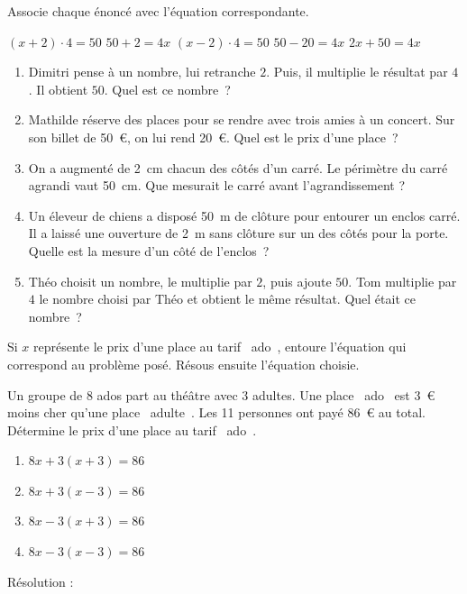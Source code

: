 \documentclass[../math2.tex]{subfiles}
\begin{document}
\begin{exercise}
  Associe chaque énoncé avec l'équation correspondante.

  $(x+2)\cdot 4 = 50$\hfil
  $50+2=4x$\hfil
  $(x-2)\cdot 4 = 50$\hfil
  $50-20=4x$\hfil
  $2x+50 = 4x$

  \begin{enumerate}
    \item Dimitri pense à un nombre, lui retranche $2$. Puis, il multiplie le résultat par $4$. Il obtient $50$. Quel est ce nombre~? 
    \item Mathilde réserve des places pour se rendre avec trois amies à un concert. Sur son billet de 50~€, on lui rend 20~€. Quel est le prix d'une place~? 
    \item On a augmenté de \SI{2}{cm} chacun des côtés d'un carré. Le périmètre du carré agrandi vaut \SI{50}{cm}. Que mesurait le carré avant l'agrandissement ? 
    \item Un éleveur de chiens a disposé \SI{50}{m} de clôture pour entourer un enclos carré. Il a laissé une ouverture de \SI{2}{m} sans clôture sur un des côtés pour la porte. Quelle est la mesure d'un côté de l'enclos~? 
    \item Théo choisit un nombre, le multiplie par $2$, puis ajoute $50$. Tom multiplie par $4$ le nombre choisi par Théo et obtient le même résultat. Quel était ce nombre~? 
  \end{enumerate}
\end{exercise}

\begin{exercise}
  Si $x$ représente le prix d'une place au tarif \og~ado~\fg{}, entoure l'équation qui correspond au problème posé. Résous ensuite l'équation choisie.

  Un groupe de 8 ados part au théâtre avec 3 adultes. Une place \og~ado~\fg{} est 3~€ moins cher qu'une place \og~adulte~\fg{}. Les 11 personnes ont payé 86~€ au total. Détermine le prix d'une place au tarif \og~ado~\fg{}.
  \begin{enumerate}[cols=2]
    \item $8x+3(x+3)=86$
    \item $8x+3(x-3)=86$
    \item $8x-3(x+3)=86$
    \item $8x-3(x-3)=86$
  \end{enumerate}
  Résolution : \vspace*{5cm}
\end{exercise}
\end{document}
